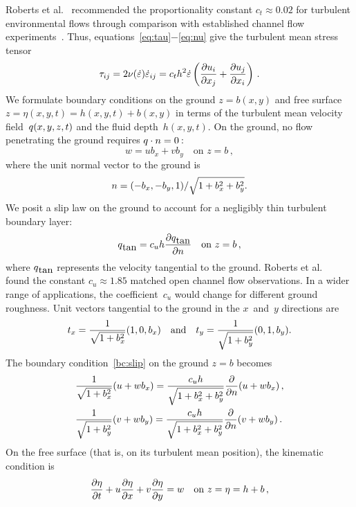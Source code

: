 \documentclass[a5paper,12pt]{article}
\newcommand{\ros}{{\dot\varepsilon}}
\renewcommand{\vec}[1]{\text{\boldmath$#1$}}
\begin{document}
Roberts et al.~\cite{Roberts2008} recommended the proportionality constant $c_t\approx0.02$ for turbulent environmental flows through comparison with established channel flow experiments~\cite[e.g.]{Nezu2005}.
Thus, equations~\eqref{eq:tau}$-$\eqref{eq:nu} give the turbulent mean stress tensor
\begin{equation}
\tau_{ij}=2\nu(\ros)\ros_{ij}=c_th^2\ros\left( \D{x_j}{u_i} +\D{x_i}{u_j}\right) \,.\label{eq:stress}
\end{equation}
We formulate boundary conditions on the ground $z=b(x,y)$ and free surface $z=\eta(x,y,t)=h(x,y,t)+b(x,y)$ in terms of the turbulent mean velocity field~$\vec q(x,y,z,t)$ and the fluid depth~$h(x,y,t)$. 
On the ground, no flow penetrating the ground requires $\vec q\cdot\vec n=0$\,:
\begin{equation}
w=ub_x+vb_y \quad\text{on } z=b\,,
\label{eq:nopen}
\end{equation}
where the unit normal vector to the ground is
\begin{equation}
\vec n=(-b_x,-b_y,1)/\sqrt{1+b_x^2+b_y^2}.
\label{eq:vecn}
\end{equation} 
We posit a slip law on the ground to account for a negligibly thin turbulent boundary layer:
\begin{equation}
\vec q_{\text{tan}}=c_uh\frac{\partial\vec q_{\text{tan}}}{\partial n} \quad\text{on } z=b\,,
\label{bc:slip}
\end{equation} 
where $\vec q_{\text{tan}}$ represents the velocity tangential to the ground. 
Roberts et al.~\cite{Roberts2008} found the constant $c_u\approx1.85$ matched open channel flow observations. 
In a wider range of applications, the coefficient~$c_u$ would change for different ground roughness. 
Unit vectors tangential to the ground in the $x$~and~$y$ directions are
\begin{equation*}
\vec t_x=\frac{1}{\sqrt{1+b_x^2}}(1,0,b_x)
\quad\text{and}\quad
\vec t_y=\frac{1}{\sqrt{1+b_y^2}}(0,1,b_y).
\end{equation*}
The boundary condition~\eqref{bc:slip} on the ground \(z=b\) becomes
\begin{align}&
\frac{1}{\sqrt{1+b_x^2}}(u+wb_x)=\frac{c_uh}{\sqrt{1+b_x^2+b_y^2}}\D n{}(u+wb_x)\,,\label{slip:u}\\&
\frac{1}{\sqrt{1+b_y^2}}(v+wb_y)=\frac{c_uh}{\sqrt{1+b_x^2+b_y^2}}\D n{}(v+wb_y)\,.\label{slip:v}
\end{align}
On the free surface (that is, on its turbulent mean position), the kinematic condition is 
\begin{equation}
 \D{t}{\eta}+u\D{x}{\eta}+v\D{y}{\eta}=w \quad\text{on } z=\eta=h+b\,,
\end{equation}
\end{document}
